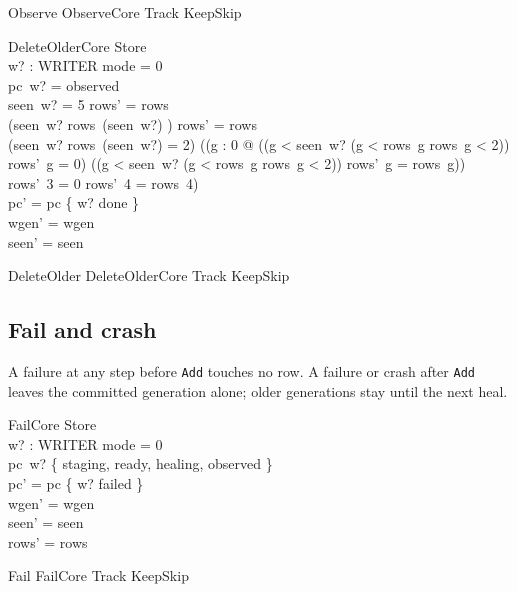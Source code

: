 \documentclass[a4paper,10pt,fleqn]{article}
\newcommand{\field}[1]{\texttt{#1}}
\begin{document}
\begin{zed}
Observe  ObserveCore \land Track \land KeepSkip
\end{zed}

\begin{schema}{DeleteOlderCore}
\Delta Store \\ w? : WRITER
\where
mode = 0 \\
pc~w? = observed \\
seen~w? = 5 \implies rows' = rows \\
(seen~w?  \land rows~(seen~w?) ) \implies rows' = rows \\
(seen~w?  \land rows~(seen~w?) = 2) \implies
  ((\forall g : 0  @
    ((g < seen~w? \lor (g   < rows~g \land rows~g < 2))
       \implies rows'~g = 0) \land
    (\lnot (g < seen~w? \lor (g   < rows~g \land rows~g < 2))
       \implies rows'~g = rows~g)) \land
   rows'~3 = 0 \land rows'~4 = rows~4) \\
pc' = pc \oplus \{ w? \mapsto done \} \\
wgen' = wgen \\
seen' = seen
\end{schema}

\begin{zed}
DeleteOlder  DeleteOlderCore \land Track \land KeepSkip
\end{zed}

\subsection{Fail and crash}

A failure at any step before \field{Add} touches no row. A failure or crash
after \field{Add} leaves the committed generation alone; older generations stay
until the next heal.

\begin{schema}{FailCore}
\Delta Store \\ w? : WRITER
\where
mode = 0 \\
pc~w? \in \{ staging, ready, healing, observed \} \\
pc' = pc \oplus \{ w? \mapsto failed \} \\
wgen' = wgen \\
seen' = seen \\
rows' = rows
\end{schema}

\begin{zed}
Fail  FailCore \land Track \land KeepSkip
\end{zed}
\end{document}
